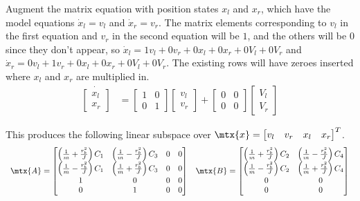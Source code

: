 Augment the matrix equation with position states $x_l$ and $x_r$, which have the
model equations $\dot{x}_l = v_l$ and $\dot{x}_r = v_r$. The matrix elements
corresponding to $v_l$ in the first equation and $v_r$ in the second equation
will be $1$, and the others will be $0$ since they don't appear, so
$\dot{x}_l = 1v_l + 0v_r + 0x_l + 0x_r + 0V_l + 0V_r$ and
$\dot{x}_r = 0v_l + 1v_r + 0x_l + 0x_r + 0V_l + 0V_r$. The existing rows will
have zeroes inserted where $x_l$ and $x_r$ are multiplied in.
\begin{align*}
  \dot{\begin{bmatrix}
    x_l \\
    x_r
  \end{bmatrix}} &=
  \begin{bmatrix}
    1 & 0 \\
    0 & 1
  \end{bmatrix}
  \begin{bmatrix}
    v_l \\
    v_r
  \end{bmatrix} +
  \begin{bmatrix}
    0 & 0 \\
    0 & 0
  \end{bmatrix}
  \begin{bmatrix}
    V_l \\
    V_r
  \end{bmatrix}
\end{align*}

This produces the following linear subspace over
$\mtx{x} = \begin{bmatrix}v_l & v_r & x_l & x_r\end{bmatrix}^T$.
\begin{equation}
  \begin{array}{ll}
    \mtx{A} =
    \begin{bmatrix}
      \left(\frac{1}{m} + \frac{r_b^2}{J}\right) C_1 &
        \left(\frac{1}{m} - \frac{r_b^2}{J}\right) C_3 & 0 & 0 \\
      \left(\frac{1}{m} - \frac{r_b^2}{J}\right) C_1 &
        \left(\frac{1}{m} + \frac{r_b^2}{J}\right) C_3 & 0 & 0 \\
      1 & 0 & 0 & 0 \\
      0 & 1 & 0 & 0
    \end{bmatrix} &
    \mtx{B} =
    \begin{bmatrix}
      \left(\frac{1}{m} + \frac{r_b^2}{J}\right) C_2 &
        \left(\frac{1}{m} - \frac{r_b^2}{J}\right) C_4 \\
      \left(\frac{1}{m} - \frac{r_b^2}{J}\right) C_2 &
        \left(\frac{1}{m} + \frac{r_b^2}{J}\right) C_4 \\
      0 & 0 \\
      0 & 0
    \end{bmatrix}
    \label{eq:diff_drive_linear_subspace}
  \end{array}
\end{equation}

